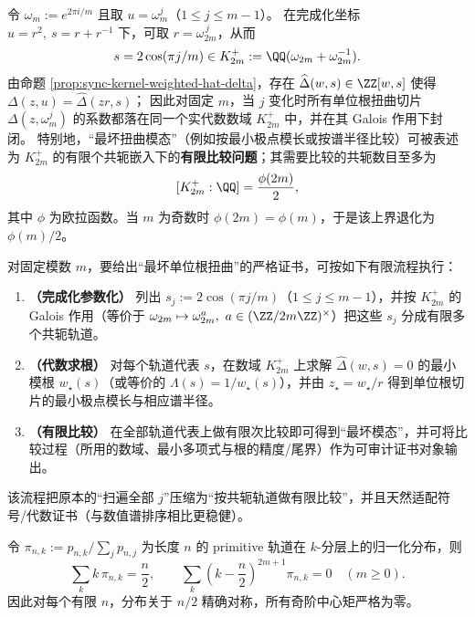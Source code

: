 \begin{corollary}\label{cor:sync-kernel-weighted-unit-root-finite}
令 \(\omega_m:=e^{2\pi i/m}\) 且取 \(u=\omega_m^j\)（\(1\le j\le m-1\)）。
在完成化坐标 \(u=r^2,\ s=r+r^{-1}\) 下，可取 \(r=\omega_{2m}^{\,j}\)，从而
\[
s=2\cos(\pi j/m)\in K_{2m}^+:=\QQ(\omega_{2m}+\omega_{2m}^{-1}).
\]
由命题 \ref{prop:sync-kernel-weighted-hat-delta}，存在 \(\widehat\Delta(w,s)\in\ZZ[w,s]\) 使得
\(
\Delta(z,u)=\widehat\Delta(zr,s)
\)；
因此对固定 \(m\)，当 \(j\) 变化时所有单位根扭曲切片 \(\Delta(z,\omega_m^j)\) 的系数都落在同一个实代数数域 \(K_{2m}^+\) 中，并在其 Galois 作用下封闭。
特别地，“最坏扭曲模态”（例如按最小极点模长或按谱半径比较）可被表述为 \(K_{2m}^+\) 的有限个共轭嵌入下的\textbf{有限比较问题}；其需要比较的共轭数目至多为
\[
[K_{2m}^+:\QQ]=\frac{\phi(2m)}{2},
\]
其中 \(\phi\) 为欧拉函数。当 \(m\) 为奇数时 \(\phi(2m)=\phi(m)\)，于是该上界退化为 \(\phi(m)/2\)。
\end{corollary}

\begin{remark}\label{rem:sync-kernel-weighted-unit-root-finite-bridge}
对固定模数 \(m\)，要给出“最坏单位根扭曲”的严格证书，可按如下有限流程执行：
\begin{enumerate}
  \item \textbf{（完成化参数化）} 列出 \(s_j:=2\cos(\pi j/m)\)（\(1\le j\le m-1\)），并按 \(K_{2m}^+\) 的 Galois 作用（等价于 \(\omega_{2m}\mapsto \omega_{2m}^a,\ a\in(\ZZ/2m\ZZ)^\times\)）把这些 \(s_j\) 分成有限多个共轭轨道。
  \item \textbf{（代数求根）} 对每个轨道代表 \(s\)，在数域 \(K_{2m}^+\) 上求解 \(\widehat\Delta(w,s)=0\) 的最小模根 \(w_\star(s)\)（或等价的 \(\Lambda(s)=1/w_\star(s)\)），并由 \(z_\star=w_\star/r\) 得到单位根切片的最小极点模长与相应谱半径。
  \item \textbf{（有限比较）} 在全部轨道代表上做有限次比较即可得到“最坏模态”，并可将比较过程（所用的数域、最小多项式与根的精度/尾界）作为可审计证书对象输出。
\end{enumerate}
该流程把原本的“扫遍全部 \(j\)”压缩为“按共轭轨道做有限比较”，并且天然适配符号/代数证书（与数值谱排序相比更稳健）。
\end{remark}

\begin{corollary}[有限长度的精确镜像对称]\label{cor:primitive-finite-sym}
令 $\pi_{n,k}:=p_{n,k}/\sum_j p_{n,j}$ 为长度 $n$ 的 primitive 轨道在 $k$-分层上的归一化分布，则
\[
\sum_k k\,\pi_{n,k}=\frac{n}{2},\qquad
\sum_k\left(k-\frac{n}{2}\right)^{2m+1}\pi_{n,k}=0\quad(m\ge 0).
\]
因此对每个有限 $n$，分布关于 $n/2$ 精确对称，所有奇阶中心矩严格为零。
\end{corollary}

